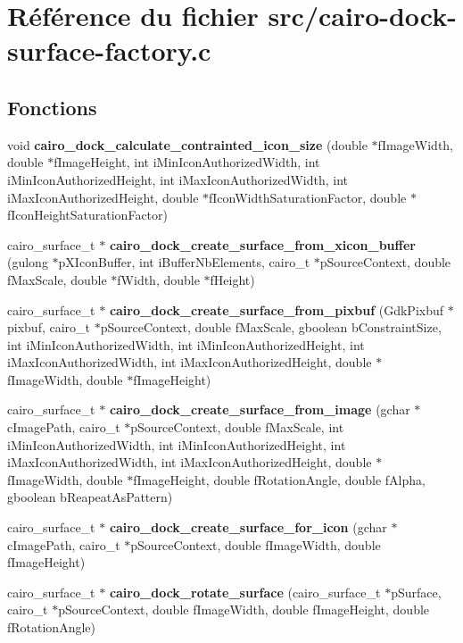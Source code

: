 \section{R\'{e}f\'{e}rence du fichier src/cairo-dock-surface-factory.c}
\label{cairo-dock-surface-factory_8c}
\subsection*{Fonctions}
\begin{CompactItemize}
\item 
void {\bf cairo\_\-dock\_\-calculate\_\-contrainted\_\-icon\_\-size} (double $\ast$f\-Image\-Width, double $\ast$f\-Image\-Height, int i\-Min\-Icon\-Authorized\-Width, int i\-Min\-Icon\-Authorized\-Height, int i\-Max\-Icon\-Authorized\-Width, int i\-Max\-Icon\-Authorized\-Height, double $\ast$f\-Icon\-Width\-Saturation\-Factor, double $\ast$f\-Icon\-Height\-Saturation\-Factor)
\item 
cairo\_\-surface\_\-t $\ast$ {\bf cairo\_\-dock\_\-create\_\-surface\_\-from\_\-xicon\_\-buffer} (gulong $\ast$p\-XIcon\-Buffer, int i\-Buffer\-Nb\-Elements, cairo\_\-t $\ast$p\-Source\-Context, double f\-Max\-Scale, double $\ast$f\-Width, double $\ast$f\-Height)
\item 
cairo\_\-surface\_\-t $\ast$ {\bf cairo\_\-dock\_\-create\_\-surface\_\-from\_\-pixbuf} (Gdk\-Pixbuf $\ast$pixbuf, cairo\_\-t $\ast$p\-Source\-Context, double f\-Max\-Scale, gboolean b\-Constraint\-Size, int i\-Min\-Icon\-Authorized\-Width, int i\-Min\-Icon\-Authorized\-Height, int i\-Max\-Icon\-Authorized\-Width, int i\-Max\-Icon\-Authorized\-Height, double $\ast$f\-Image\-Width, double $\ast$f\-Image\-Height)
\item 
cairo\_\-surface\_\-t $\ast$ {\bf cairo\_\-dock\_\-create\_\-surface\_\-from\_\-image} (gchar $\ast$c\-Image\-Path, cairo\_\-t $\ast$p\-Source\-Context, double f\-Max\-Scale, int i\-Min\-Icon\-Authorized\-Width, int i\-Min\-Icon\-Authorized\-Height, int i\-Max\-Icon\-Authorized\-Width, int i\-Max\-Icon\-Authorized\-Height, double $\ast$f\-Image\-Width, double $\ast$f\-Image\-Height, double f\-Rotation\-Angle, double f\-Alpha, gboolean b\-Reapeat\-As\-Pattern)
\item 
cairo\_\-surface\_\-t $\ast$ {\bf cairo\_\-dock\_\-create\_\-surface\_\-for\_\-icon} (gchar $\ast$c\-Image\-Path, cairo\_\-t $\ast$p\-Source\-Context, double f\-Image\-Width, double f\-Image\-Height)
\item 
cairo\_\-surface\_\-t $\ast$ {\bf cairo\_\-dock\_\-rotate\_\-surface} (cairo\_\-surface\_\-t $\ast$p\-Surface, cairo\_\-t $\ast$p\-Source\-Context, double f\-Image\-Width, double f\-Image\-Height, double f\-Rotation\-Angle)

\end{CompactItemize}
